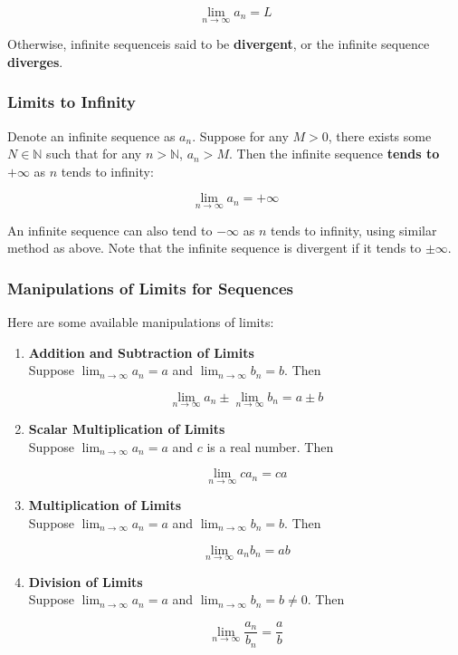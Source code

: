 \documentclass[a4paper,12pt]{article}
\newcommand{\s}{\vspace{1mm}}
\newcommand{\N}{\mathbb{N}}
\newenvironment{alist}{ %
\begin{enumerate}[label=(\alph*)]
}{
\end{enumerate}
}
\begin{document}
$$\lim_{n\to \infty}a_{n}=L$$\s

Otherwise, infinite sequenceis said to be \textbf{divergent}, or the infinite sequence \textbf{diverges}.

\subsubsection{Limits to Infinity}
Denote an infinite sequence as $a_{n}$. Suppose for any $M>0$, there exists some $N\in \N$ such that for any $n>\N$, $a_{n}>M$. Then the infinite sequence \textbf{tends to} $+\infty$ as $n$ tends to infinity:

$$\lim_{n\to \infty}a_{n}=+\infty$$\s

An infinite sequence can also tend to $-\infty$ as $n$ tends to infinity, using similar method as above. Note that the infinite sequence is divergent if it tends to $\pm \infty$.

\subsubsection{Manipulations of Limits for Sequences}
Here are some available manipulations of limits:
\begin{alist}
 \item \textbf{Addition and Subtraction of Limits}\\
 Suppose $\lim_{n\to \infty}a_{n}=a$ and $\lim_{n\to \infty}b_{n}=b$. Then

 $$\lim_{n\to \infty}a_{n}\pm \lim_{n\to \infty}b_{n}=a\pm b$$

 \item \textbf{Scalar Multiplication of Limits}\\
 Suppose $\lim_{n\to \infty}a_{n}=a$ and $c$ is a real number. Then

 $$\lim_{n\to \infty}ca_{n}=ca$$

 \item \textbf{Multiplication of Limits}\\
 Suppose $\lim_{n\to \infty}a_{n}=a$ and $\lim_{n\to \infty}b_{n}=b$. Then

 $$\lim_{n\to \infty}a_{n}b_{n}=ab$$

 \item \textbf{Division of Limits}\\
 Suppose $\lim_{n\to \infty}a_{n}=a$ and $\lim_{n\to \infty}b_{n}=b\neq 0$. Then

 $$\lim_{n\to \infty}\frac{a_{n}}{b_{n}}=\frac{a}{b}$$
\end{alist}
\end{document}
